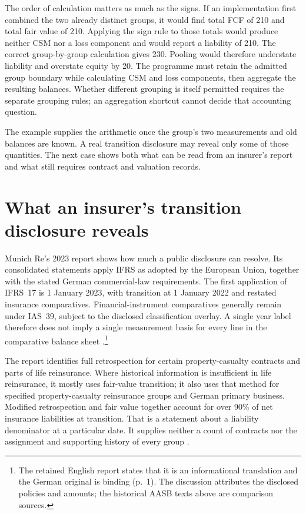The order of calculation matters as much as the signs. If an implementation
first combined the two already distinct groups, it would find total FCF of
210 and total fair value of 210. Applying the sign rule to those totals would
produce neither CSM nor a loss component and would report a liability of 210.
The correct group-by-group calculation gives 230. Pooling would therefore
understate liability and overstate equity by 20. The programme must retain
the admitted group boundary while calculating CSM and loss components, then
aggregate the resulting balances. Whether different grouping is itself
permitted requires the separate grouping rules; an aggregation shortcut
cannot decide that accounting question.

The example supplies the arithmetic once the group's two measurements and
old balances are known. A real transition disclosure may reveal only some
of those quantities. The next case shows both what can be read from an
insurer's report and what still requires contract and valuation records.

\clearpage
\hypertarget{munich-re-transition-disclosure}{%
\section{What an insurer's transition disclosure reveals}\label{method-insurance-munich-transition}}

Munich Re's 2023 report shows how much a public disclosure can resolve.
Its consolidated statements apply IFRS as adopted by the European Union,
together with the stated German commercial-law requirements. The first
application of IFRS~17 is 1 January 2023, with transition at 1 January 2022
and restated insurance comparatives. Financial-instrument comparatives
generally remain under IAS~39, subject to the disclosed classification
overlay. A single year label therefore does not imply a single measurement
basis for every line in the comparative balance sheet
\citep[pp.~155 and 183--184]{munichre2023annual}.\footnote{The retained
English report states that it is an informational translation and the German
original is binding (p.~1). The discussion attributes the disclosed policies
and amounts; the historical AASB texts above are comparison sources.}

The report identifies full retrospection for certain property-casualty
contracts and parts of life reinsurance. Where historical information is
insufficient in life reinsurance, it mostly uses fair-value transition; it
also uses that method for specified property-casualty reinsurance groups and
German primary business. Modified retrospection and fair value together
account for over 90\% of net insurance liabilities at transition. That is a
statement about a liability denominator at a particular date. It supplies
neither a count of contracts nor the assignment and supporting history of
every group \citep[p.~183]{munichre2023annual}.

